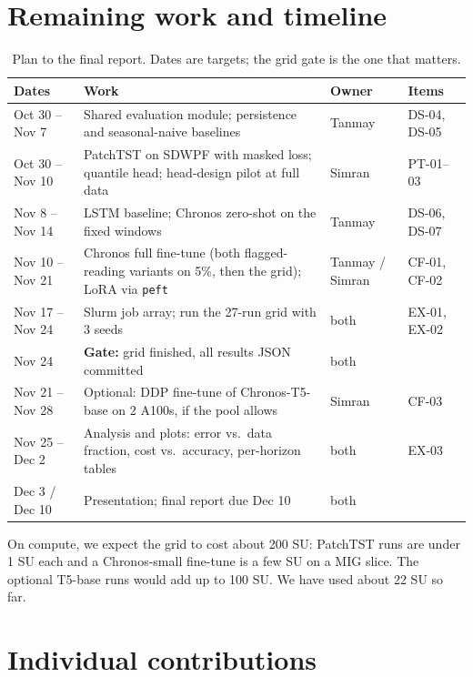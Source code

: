 \documentclass[11pt]{article}
\newcommand{\code}[1]{\texttt{\small #1}}
\begin{document}
\section{Remaining work and timeline}

\begin{table}[H]
\centering\small
\caption{Plan to the final report. Dates are targets; the grid gate is the one that matters.}
\label{tab:timeline}
\footnotesize\setlength{\tabcolsep}{4pt}\begin{tabular}{@{}lp{8.2cm}ll@{}}
\toprule
Dates & Work & Owner & Items \\
\midrule
Oct 30 -- Nov 7  & Shared evaluation module; persistence and seasonal-naive baselines & Tanmay & DS-04, DS-05 \\
Oct 30 -- Nov 10 & PatchTST on SDWPF with masked loss; quantile head; head-design pilot at full data & Simran & PT-01--03 \\
Nov 8 -- Nov 14  & LSTM baseline; Chronos zero-shot on the fixed windows & Tanmay & DS-06, DS-07 \\
Nov 10 -- Nov 21 & Chronos full fine-tune (both flagged-reading variants on 5\%, then the grid); LoRA via \code{peft} & Tanmay / Simran & CF-01, CF-02 \\
Nov 17 -- Nov 24 & Slurm job array; run the 27-run grid with 3 seeds & both & EX-01, EX-02 \\
Nov 24          & \textbf{Gate:} grid finished, all results JSON committed & both & \\
Nov 21 -- Nov 28 & Optional: DDP fine-tune of Chronos-T5-base on 2 A100s, if the pool allows & Simran & CF-03 \\
Nov 25 -- Dec 2  & Analysis and plots: error vs.\ data fraction, cost vs.\ accuracy, per-horizon tables & both & EX-03 \\
Dec 3 / Dec 10   & Presentation; final report due Dec 10 & both & \\
\bottomrule
\end{tabular}
\end{table}

On compute, we expect the grid to cost about 200 SU: PatchTST runs are under 1 SU each and a Chronos-small
fine-tune is a few SU on a MIG slice. The optional T5-base runs would add up to 100 SU. We have used about 22 SU
so far.

\section{Individual contributions}
\end{document}
